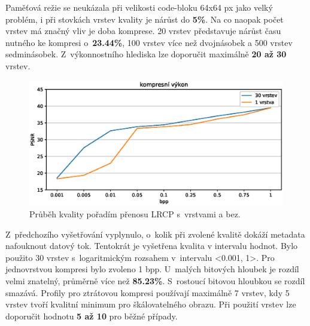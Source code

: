 \noindent Paměťová režie se neukázala při velikosti code-bloku 64x64 px jako velký problém, i při stovkách vrstev kvality je nárůst do \textbf{5\%}. Na co naopak počet vrstev má značný vliv je doba komprese. 20 vrstev představuje nárůst času nutného ke kompresi o~\textbf{23.44\%}, 100 vrstev více než dvojnásobek a 500 vrstev sedminásobek. Z~výkonnostního hlediska lze doporučit maximálně \textbf{20 až 30} vrstev. 
\clearpage

\begin{figure}[hbt!]
  \centering
  \hspace*{-0.75cm}
  \includegraphics[width=16cm]{obrazky-figures/layers.eps}
  \caption{Průběh kvality pořadím přenosu LRCP s~vrstvami a bez.}
\end{figure}
Z~předchozího vyšetřování vyplynulo, o~kolik při zvolené kvalitě dokáží metadata nafouknout datový tok. Tentokrát je vyšetřena kvalita v intervalu hodnot. Bylo použito 30 vrstev s~logaritmickým rozsahem v~intervalu <0.001, 1>. Pro jednovrstvou kompresi bylo zvoleno 1 bpp. U~malých bitových hloubek je rozdíl velmi znatelný, průměrně více než \textbf{85.23\%}. S~rostoucí bitovou hloubkou se rozdíl smazává. Profily pro ztrátovou kompresi používají maximálně 7 vrstev, kdy 5 vrstev tvoří kvalitní minimum pro škálovatelného obrazu. Při použití vrstev lze doporučit hodnotu \textbf{5 až 10} pro běžné případy.

\clearpage

%
%
\newpage
